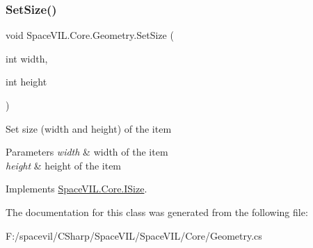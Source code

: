 \subsubsection{\texorpdfstring{Set\+Size()}{SetSize()}}
{\footnotesize\ttfamily void Space\+V\+I\+L.\+Core.\+Geometry.\+Set\+Size (\begin{DoxyParamCaption}\item[{int}]{width,  }\item[{int}]{height }\end{DoxyParamCaption})}



Set size (width and height) of the item 


\begin{DoxyParams}{Parameters}
{\em width} & width of the item \\
\hline
{\em height} & height of the item \\
\hline
\end{DoxyParams}


Implements \mbox{\hyperlink{interface_space_v_i_l_1_1_core_1_1_i_size}{Space\+V\+I\+L.\+Core.\+I\+Size}}.



The documentation for this class was generated from the following file\+:\begin{DoxyCompactItemize}
\item 
F\+:/spacevil/\+C\+Sharp/\+Space\+V\+I\+L/\+Space\+V\+I\+L/\+Core/Geometry.\+cs\end{DoxyCompactItemize}
